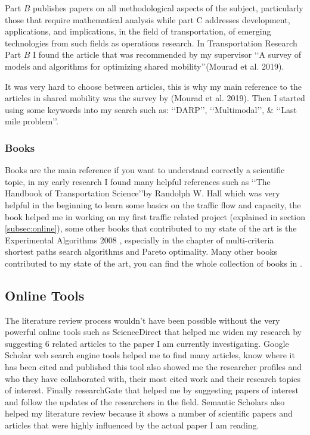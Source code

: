 \documentclass{article}
\begin{document}
Part $B$ publishes papers on all methodological aspects of the subject, particularly those that require mathematical analysis while part C addresses development, applications, and implications, in the field of transportation, of emerging technologies
 from such fields as operations research. In Transportation Research Part $B$ I found the article that was recommended by my supervisor \lq\lq{A survey of models and algorithms for optimizing shared mobility}\rq\rq (Mourad et al. 2019)\citep{MOURAD2019}.

It was very hard to choose between articles, this is why my main reference to the articles in shared mobility was the survey by (Mourad et al. 2019)\citep{MOURAD2019}. Then I started using some keywords into my search such as: \lq\lq{DARP}\rq\rq, \lq\lq{Multimodal}\rq\rq, \& \lq\lq{Last mile problem}\rq\rq.

\subsubsection{Books}

Books are the main reference if you want to understand correctly a scientific topic, in my early research I found many helpful references such as \lq\lq{The Handbook of Transportation Science}\rq\rq by Randolph W. Hall \cite{Randolphts} which was very helpful in the beginning to learn some basics on the traffic flow and capacity, the book helped me in working on my first traffic related project (explained in section \ref{subsec:online}), some other books that contributed to my state of the art is the Experimental Algorithms 2008 \cite{bookexpalg}, especially in the chapter of multi-criteria shortest paths search algorithms and Pareto optimality. Many other books contributed to my state of the art, you can find the whole collection of books in  \cite{my_bibliography}.


\subsection{Online Tools}
\label{subsec:onlinetools}

The literature review process wouldn\rq{t} have been possible without the very powerful online tools such as ScienceDirect that helped me widen my research by suggesting $6$ related articles to the paper I am currently investigating.
Google Scholar web search engine tools helped me to find many articles, know where it has been cited and published this tool also showed me the researcher profiles and who they have collaborated with, their most cited work and their research topics of interest. Finally researchGate that helped me by suggesting papers of interest and follow the updates of the researchers in the field.
Semantic Scholars also helped my literature review because it shows a number of scientific papers and articles that were highly influenced by the actual paper I am reading.
\end{document}
